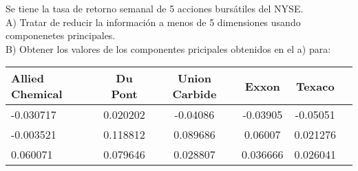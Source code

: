 \begin{problem}{1}
Se tiene la tasa de retorno semanal de 5 acciones bursátiles del NYSE.\\
A) Tratar de reducir la información a menos de 5 dimensiones usando componenetes principales.\\
B) Obtener los valores de los componentes pricipales obtenidos en el a) para:
\begin{table}[h]
    \centering
    \begin{tabular}{lccccc}
        \toprule
         Allied Chemical & Du Pont & Union Carbide & Exxon & Texaco \\
        \midrule
        -0.030717 & 0.020202 & -0.04086 & -0.03905 & -0.05051 \\
        -0.003521 & 0.118812 & 0.089686 & 0.06007 & 0.021276 \\
        0.060071  & 0.079646 & 0.028807 & 0.036666 & 0.026041 \\
        \bottomrule
    \end{tabular}
    \label{tab:datos}
\end{table}
\end{problem}
